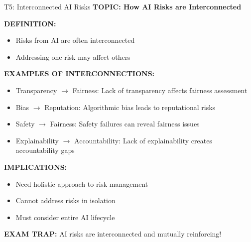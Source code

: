 \documentclass[8pt]{beamer}
\begin{document}
	\begin{frame}{T5: Interconnected AI Risks}
		\fontsize{6.5}{7.5}\selectfont
		\textbf{TOPIC: How AI Risks are Interconnected}
		
		\vspace{0.1cm}
		\textbf{DEFINITION:}
		\begin{itemize}
			\item Risks from AI are often interconnected
			\item Addressing one risk may affect others
		\end{itemize}
		
		\vspace{0.1cm}
		\textbf{EXAMPLES OF INTERCONNECTIONS:}
		\begin{itemize}
			\item \textcolor{myblue}{Transparency $\to$ Fairness:} Lack of transparency affects fairness assessment
			\item \textcolor{myblue}{Bias $\to$ Reputation:} Algorithmic bias leads to reputational risks
			\item \textcolor{myblue}{Safety $\to$ Fairness:} Safety failures can reveal fairness issues
			\item \textcolor{myblue}{Explainability $\to$ Accountability:} Lack of explainability creates accountability gaps
		\end{itemize}
		
		\vspace{0.1cm}
		\textbf{IMPLICATIONS:}
		\begin{itemize}
			\item Need holistic approach to risk management
			\item Cannot address risks in isolation
			\item Must consider entire AI lifecycle
		\end{itemize}
		
		\textcolor{myred}{\textbf{EXAM TRAP:}} AI risks are \textcolor{myblue}{interconnected and mutually reinforcing}!
	\end{frame}
	
	
\end{document}
